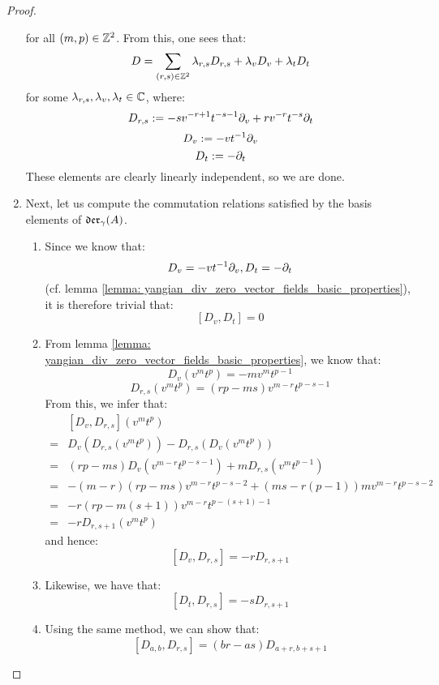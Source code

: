 \begin{proof}
\begin{enumerate}
$$                        $$
                    for all $(m, p) \in \mathbb{Z}^2$. From this, one sees that:
                        $$D = \sum_{(r, s) \in \mathbb{Z}^2} \lambda_{r, s} D_{r, s} + \lambda_v D_v + \lambda_t D_t$$
                    for some $\lambda_{r, s}, \lambda_v, \lambda_t \in \mathbb{C}$, where:
                        $$D_{r, s} := -s v^{-r + 1} t^{-s - 1} \partial_v + r v^{-r} t^{-s} \partial_t$$
                        $$D_v := -v t^{-1} \partial_v$$
                        $$D_t := -\partial_t$$
                    These elements are clearly linearly independent, so we are done.
                    \item Next, let us compute the commutation relations satisfied by the basis elements of $\mathfrak{der}_{\gamma}(A)$.
                    \begin{enumerate}
                        \item Since we know that:
                            $$D_v = -vt^{-1} \partial_v, D_t = -\partial_t$$
                        (cf. lemma \ref{lemma: yangian_div_zero_vector_fields_basic_properties}), it is therefore trivial that:
                            $$[D_v, D_t] = 0$$
                        \item From lemma \ref{lemma: yangian_div_zero_vector_fields_basic_properties}, we know that:
                            $$D_v(v^m t^p) = -m v^m t^{p - 1}$$
                            $$D_{r, s}(v^m t^p) = ( rp - ms ) v^{m - r} t^{p - s - 1}$$
                        From this, we infer that:
                            $$
                                \begin{aligned}
                                    & [D_v, D_{r, s}](v^m t^p)
                                    \\
                                    = & D_v( D_{r, s}(v^m t^p) ) - D_{r, s}( D_v(v^m t^p) )
                                    \\
                                    = & (rp - ms) D_v( v^{m - r} t^{p - s - 1} ) + m D_{r, s}( v^m t^{p - 1} )
                                    \\
                                    = & -(m - r)(rp - ms) v^{m - r} t^{p - s - 2} + (ms - r(p - 1)) m v^{m - r} t^{p - s - 2}
                                    \\
                                    = & -r(rp - m(s + 1)) v^{m - r} t^{p - (s + 1) - 1}
                                    \\
                                    = & -r D_{r, s + 1}(v^m t^p)
                                \end{aligned}
                            $$
                        and hence:
                            $$[D_v, D_{r, s}] = -r D_{r, s + 1}$$
                        \item Likewise, we have that:
                            $$[D_t, D_{r, s}] = -s D_{r, s + 1}$$
                        \item Using the same method, we can show that:
                            $$[D_{a, b}, D_{r, s}] = (br - as) D_{a + r, b + s + 1}$$
                    \end{enumerate}
                \end{enumerate}
            \end{proof}
